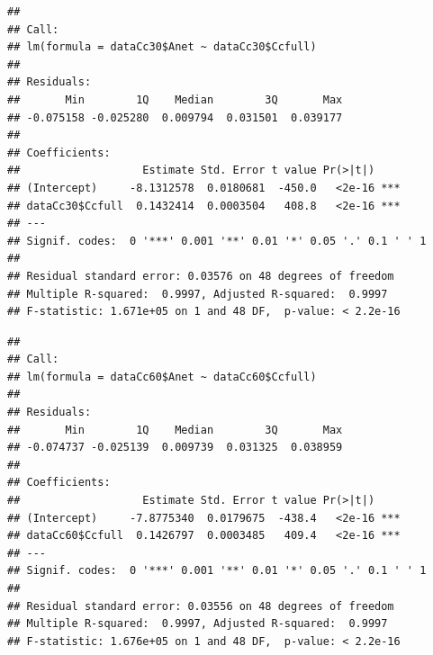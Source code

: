 \documentclass[
]{krantz}
\makeatletter
\newenvironment{Shaded}{\begin{snugshade}}{\end{snugshade}}
\newcommand{\CommentTok}[1]{\textcolor[rgb]{0.56,0.35,0.01}{\textit{#1}}}
\newcommand{\DecValTok}[1]{\textcolor[rgb]{0.00,0.00,0.81}{#1}}
\newcommand{\FunctionTok}[1]{\textcolor[rgb]{0.00,0.00,0.00}{#1}}
\newcommand{\NormalTok}[1]{#1}
\newcommand{\OtherTok}[1]{\textcolor[rgb]{0.56,0.35,0.01}{#1}}
\newcommand{\SpecialCharTok}[1]{\textcolor[rgb]{0.00,0.00,0.00}{#1}}
\newenvironment{kframe}{%
\medskip{}
\setlength{\fboxsep}{.8em}
 \def\at@end@of@kframe{}%
 \ifinner\ifhmode%
  \def\at@end@of@kframe{\end{minipage}}%
  \begin{minipage}{\columnwidth}%
 \fi\fi%
 \def\FrameCommand##1{\hskip\@totalleftmargin \hskip-\fboxsep
 \colorbox{shadecolor}{##1}\hskip-\fboxsep
     \hskip-\linewidth \hskip-\@totalleftmargin \hskip\columnwidth}%
 \MakeFramed {\advance\hsize-\width
   \@totalleftmargin\z@ \linewidth\hsize
   \@setminipage}}%
 {\par\unskip\endMakeFramed%
 \at@end@of@kframe}
\renewenvironment{Shaded}{\begin{kframe}}{\end{kframe}}
\makeatother
\begin{document}
\begin{verbatim}
## 
## Call:
## lm(formula = dataCc30$Anet ~ dataCc30$Ccfull)
## 
## Residuals:
##       Min        1Q    Median        3Q       Max 
## -0.075158 -0.025280  0.009794  0.031501  0.039177 
## 
## Coefficients:
##                   Estimate Std. Error t value Pr(>|t|)    
## (Intercept)     -8.1312578  0.0180681  -450.0   <2e-16 ***
## dataCc30$Ccfull  0.1432414  0.0003504   408.8   <2e-16 ***
## ---
## Signif. codes:  0 '***' 0.001 '**' 0.01 '*' 0.05 '.' 0.1 ' ' 1
## 
## Residual standard error: 0.03576 on 48 degrees of freedom
## Multiple R-squared:  0.9997, Adjusted R-squared:  0.9997 
## F-statistic: 1.671e+05 on 1 and 48 DF,  p-value: < 2.2e-16
\end{verbatim}

\begin{Shaded}
\end{Shaded}

\begin{verbatim}
## 
## Call:
## lm(formula = dataCc60$Anet ~ dataCc60$Ccfull)
## 
## Residuals:
##       Min        1Q    Median        3Q       Max 
## -0.074737 -0.025139  0.009739  0.031325  0.038959 
## 
## Coefficients:
##                   Estimate Std. Error t value Pr(>|t|)    
## (Intercept)     -7.8775340  0.0179675  -438.4   <2e-16 ***
## dataCc60$Ccfull  0.1426797  0.0003485   409.4   <2e-16 ***
## ---
## Signif. codes:  0 '***' 0.001 '**' 0.01 '*' 0.05 '.' 0.1 ' ' 1
## 
## Residual standard error: 0.03556 on 48 degrees of freedom
## Multiple R-squared:  0.9997, Adjusted R-squared:  0.9997 
## F-statistic: 1.676e+05 on 1 and 48 DF,  p-value: < 2.2e-16
\end{verbatim}

\begin{Shaded}
\end{Shaded}
\end{document}
